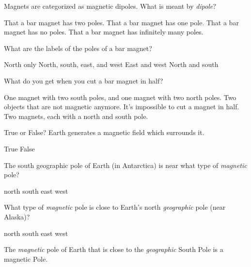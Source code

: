 \documentclass[]{exam}
\begin{document}
\begin{questions}
\question
Magnets are categorized as magnetic dipoles. What is meant by \textit{dipole}?

\begin{randomizechoices}
    \correctchoice That a bar magnet has two poles.
    \choice That a bar magnet has one pole.
    \choice That a bar magnet has no poles.
    \choice That a bar magnet has infinitely many poles.
\end{randomizechoices}

\question
What are the labels of the poles of a bar magnet?

\begin{randomizechoices}
\choice North only
\choice North, south, east, and west
\choice East and west
\CorrectChoice North and south
\end{randomizechoices}

\question
What do you get when you cut a bar magnet in half?

\begin{randomizechoices}
\choice One magnet with two south poles, and one magnet with two north poles.
\choice Two objects that are not magnetic anymore.
\choice It’s impossible to cut a magnet in half.
\CorrectChoice Two magnets, each with a north and south pole.
\end{randomizechoices}

\question
True or False? Earth generates a magnetic field which surrounds it.

\begin{randomizechoices}[norandomize]
    \correctchoice True
    \choice False
\end{randomizechoices}

\question
The south geographic pole of Earth (in Antarctica) is near what type of \textit{magnetic} pole?

\begin{randomizeoneparchoices}
    \correctchoice north
    \choice south
    \choice east
    \choice west
\end{randomizeoneparchoices}


\question
What type of \textit{magnetic} pole is close to Earth's north \textit{geographic} pole (near Alaska)? 

\begin{randomizeoneparchoices}
\choice north
\CorrectChoice south
\choice east
\choice west
\end{randomizeoneparchoices}

\question
The \textit{magnetic} pole of Earth that is close to the \textit{geographic} South Pole is a\\ magnetic \fillin Pole.


\end{questions}
\end{document}
